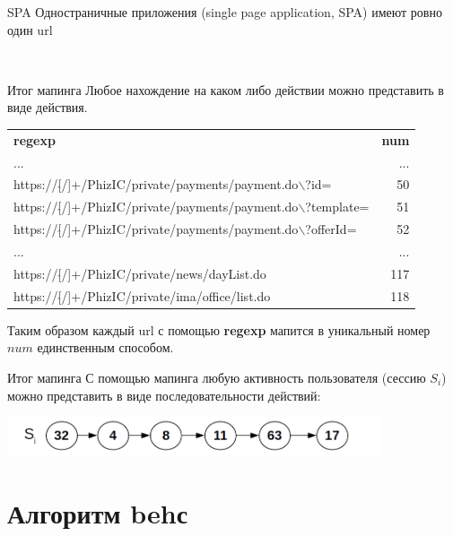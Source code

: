 \begin{frame}{SPA}
	Одностраничные приложения (single page application, SPA)
	имеют ровно один url
	
\end{frame}

\

\begin{frame}{Итог мапинга}
	\small
	Любое нахождение на каком либо действии можно представить в виде действия.
	
	\begin{tabular}{lr}
		\textbf{regexp} & \textbf{num} \\
		... & ... \\
		https://[$\hat{}$/]+/PhizIC/private/payments/payment.do$\backslash$?id= & 50 \\
		https://[$\hat{}$/]+/PhizIC/private/payments/payment.do$\backslash$?template= & 51 \\
		https://[$\hat{}$/]+/PhizIC/private/payments/payment.do$\backslash$?offerId= & 52 \\
		... & ... \\
		https://[$\hat{}$/]+/PhizIC/private/news/dayList.do & 117 \\
		https://[$\hat{}$/]+/PhizIC/private/ima/office/list.do & 118 \\
	\end{tabular}
	
	Таким образом каждый url с помощью \textbf{regexp} мапится в уникальный 
	номер $num$ единственным способом. 
\end{frame}

\begin{frame}{Итог мапинга}
	С помощью мапинга любую  активность пользователя (сессию $S_i$)
	можно представить в виде последовательности
	действий:
	
	\begin{center}
		\includegraphics[width=11cm]{../pic/beh/chain.png}\centering
	\end{center}
\end{frame}

\section{Алгоритм behс}\label{section:behс}

